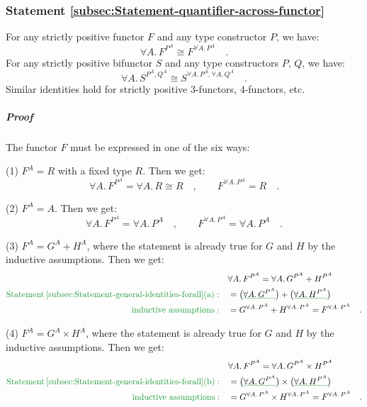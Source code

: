 \subsubsection{Statement \label{subsec:Statement-quantifier-across-functor}\ref{subsec:Statement-quantifier-across-functor}}

For any strictly positive functor $F$ and any type constructor $P$,
we have:
\[
\forall A.\,F^{P^{A}}\cong F^{\forall A.\,P^{A}}\quad.
\]
For any strictly positive bifunctor $S$ and any type constructors
$P$, $Q$, we have:
\[
\forall A.\,S^{P^{A},Q^{A}}\cong S^{\forall A.\,P^{A},\forall A.\,Q^{A}}\quad.
\]
Similar identities hold for strictly positive $3$-functors, $4$-functors,
etc.

\subparagraph{Proof}

The functor $F$ must be expressed in one of the six ways:

(1) $F^{A}=R$ with a fixed type $R$. Then we get:
\[
\forall A.\,F^{P^{A}}=\forall A.\,R\cong R\quad,\quad\quad F^{\forall A.\,P^{A}}=R\quad.
\]

(2) $F^{A}=A$. Then we get:
\[
\forall A.\,F^{P^{A}}=\forall A.\,P^{A}\quad,\quad\quad F^{\forall A.\,P^{A}}=\forall A.\,P^{A}\quad.
\]

(3) $F^{A}=G^{A}+H^{A}$, where the statement is already true for
$G$ and $H$ by the inductive assumptions. Then we get:
\begin{align*}
 & \forall A.\,F^{P^{A}}=\forall A.\,G^{P^{A}}+H^{P^{A}}\\
{\color{greenunder}\text{Statement\,\ref{subsec:Statement-general-identities-forall}(a)}:}\quad & =\big(\gunderline{\forall A.\,G^{P^{A}}}\big)+\big(\gunderline{\forall A.\,H^{P^{A}}}\big)\\
{\color{greenunder}\text{inductive assumptions}:}\quad & =G^{\forall A.\,P^{A}}+H^{\forall A.\,P^{A}}=F^{\forall A.\,P^{A}}\quad.
\end{align*}

(4) $F^{A}=G^{A}\times H^{A}$, where the statement is already true
for $G$ and $H$ by the inductive assumptions. Then we get:
\begin{align*}
 & \forall A.\,F^{P^{A}}=\forall A.\,G^{P^{A}}\times H^{P^{A}}\\
{\color{greenunder}\text{Statement\,\ref{subsec:Statement-general-identities-forall}(b)}:}\quad & =\big(\gunderline{\forall A.\,G^{P^{A}}}\big)\times\big(\gunderline{\forall A.\,H^{P^{A}}}\big)\\
{\color{greenunder}\text{inductive assumptions}:}\quad & =G^{\forall A.\,P^{A}}\times H^{\forall A.\,P^{A}}=F^{\forall A.\,P^{A}}\quad.
\end{align*}

